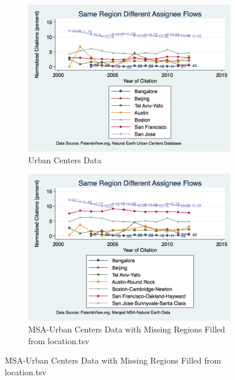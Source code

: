 \documentclass[12pt]{article}
\begin{document}
\begin{figure}
  \begin{subfigure}[b]{\textwidth}
    \includegraphics[width=\textwidth]{UCSameRegionDiffAssigneeFlows}
    \caption{Urban Centers Data}
    \label{fig:UCSameRegionDiffAssigneeFlows}
  \end{subfigure}
  
  \begin{subfigure}[b]{\textwidth}
    \includegraphics[width=\textwidth]{SameRegionDiffAssigneeFlows}
    \caption{MSA-Urban Centers Data with Missing Regions Filled from location.tsv}
    \label{fig:SameRegionDiffAssigneeFlows}
  \end{subfigure}
\end{figure}
\end{document}
